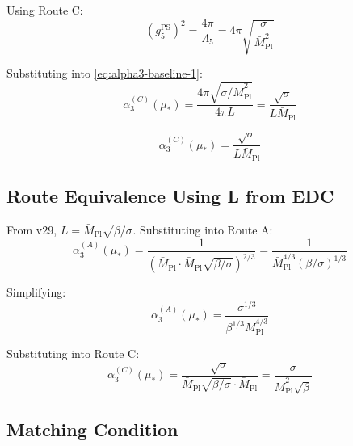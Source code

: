 \documentclass[11pt,a4paper]{article}
\theoremstyle{definition}
\begin{document}
Using Route C:
\begin{equation}
\label{eq:route-c-g5}
(g_5^{\text{PS}})^2 = \frac{4\pi}{\Lambda_5} = 4\pi\sqrt{\frac{\sigma}{\bar{M}_{\text{Pl}}^2}}
\end{equation}

Substituting into \eqref{eq:alpha3-baseline-1}:
\begin{equation}
\label{eq:alpha3-route-c}
\alpha_3^{(C)}(\mu_*) = \frac{4\pi\sqrt{\sigma/\bar{M}_{\text{Pl}}^2}}{4\pi L}
  = \frac{\sqrt{\sigma}}{L\bar{M}_{\text{Pl}}}
\end{equation}

\begin{closurebox}
\begin{equation}
\label{eq:alpha3-route-c-final}
\boxed{\alpha_3^{(C)}(\mu_*) = \frac{\sqrt{\sigma}}{L\bar{M}_{\text{Pl}}}}
\end{equation}
\end{closurebox}

\subsection{Route Equivalence Using L from EDC}
\label{subsec:route-equivalence}

From v29, $L = \bar{M}_{\text{Pl}}\sqrt{\beta/\sigma}$. Substituting into Route A:
\begin{equation}
\label{eq:equiv-a}
\alpha_3^{(A)}(\mu_*) = \frac{1}{\left(\bar{M}_{\text{Pl}} \cdot \bar{M}_{\text{Pl}}\sqrt{\beta/\sigma}\right)^{2/3}}
  = \frac{1}{\bar{M}_{\text{Pl}}^{4/3} (\beta/\sigma)^{1/3}}
\end{equation}

Simplifying:
\begin{equation}
\label{eq:equiv-a-simp}
\alpha_3^{(A)}(\mu_*) = \frac{\sigma^{1/3}}{\beta^{1/3} \bar{M}_{\text{Pl}}^{4/3}}
\end{equation}

Substituting into Route C:
\begin{equation}
\label{eq:equiv-c}
\alpha_3^{(C)}(\mu_*) = \frac{\sqrt{\sigma}}{\bar{M}_{\text{Pl}}\sqrt{\beta/\sigma} \cdot \bar{M}_{\text{Pl}}}
  = \frac{\sigma}{\bar{M}_{\text{Pl}}^2 \sqrt{\beta}}
\end{equation}

\subsection{Matching Condition}
\label{subsec:matching-condition}
\end{document}
